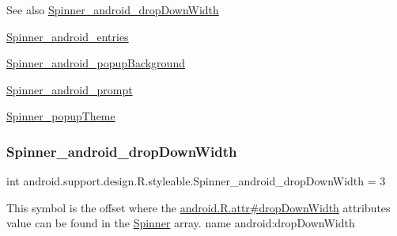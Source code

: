 \begin{DoxySeeAlso}{See also}
\hyperlink{classandroid_1_1support_1_1design_1_1R_1_1styleable_ae8ecbc06818c2f20c1ce916dea5258d0}{Spinner\+\_\+android\+\_\+drop\+Down\+Width} 

\hyperlink{classandroid_1_1support_1_1design_1_1R_1_1styleable_a2d05682e0b3d919b968bca48f733aab2}{Spinner\+\_\+android\+\_\+entries} 

\hyperlink{classandroid_1_1support_1_1design_1_1R_1_1styleable_ae1f9a39bc965c26a19d360729ee54483}{Spinner\+\_\+android\+\_\+popup\+Background} 

\hyperlink{classandroid_1_1support_1_1design_1_1R_1_1styleable_a601b330e85f621a2fd8f83ea6aa87d52}{Spinner\+\_\+android\+\_\+prompt} 

\hyperlink{classandroid_1_1support_1_1design_1_1R_1_1styleable_a59a6d161b7f6cda7fafb201a44bebca6}{Spinner\+\_\+popup\+Theme} 
\end{DoxySeeAlso}
\mbox{\label{classandroid_1_1support_1_1design_1_1R_1_1styleable_ae8ecbc06818c2f20c1ce916dea5258d0}} 
\subsubsection{\texorpdfstring{Spinner\+\_\+android\+\_\+drop\+Down\+Width}{Spinner\_android\_dropDownWidth}}
{\footnotesize\ttfamily int android.\+support.\+design.\+R.\+styleable.\+Spinner\+\_\+android\+\_\+drop\+Down\+Width = 3\hspace{0.3cm}{\ttfamily [static]}}

This symbol is the offset where the \hyperlink{}{android.\+R.\+attr\#drop\+Down\+Width} attribute\textquotesingle{}s value can be found in the \hyperlink{classandroid_1_1support_1_1design_1_1R_1_1styleable_ac36e55e5a1c717e866dcadd92552fa64}{Spinner} array.  name android\+:drop\+Down\+Width \mbox{\label{classandroid_1_1support_1_1design_1_1R_1_1styleable_a2d05682e0b3d919b968bca48f733aab2}} 
